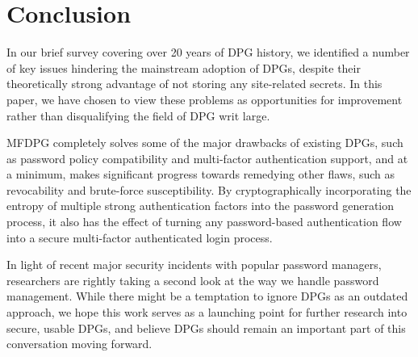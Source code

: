 \section{Conclusion}

In our brief survey covering over 20 years of DPG history, we identified a number of key issues hindering the mainstream adoption of DPGs, despite their theoretically strong advantage of not storing any site-related secrets. 
In this paper, we have chosen to view these problems as opportunities for improvement rather than disqualifying the field of DPG writ large.

MFDPG completely solves some of the major drawbacks of existing DPGs, such as password policy compatibility and multi-factor authentication support, and at a minimum, makes significant progress towards remedying other flaws, such as revocability and brute-force susceptibility. By cryptographically incorporating the entropy of multiple strong authentication factors into the password generation process, it also has the effect of turning any password-based authentication flow into a secure multi-factor authenticated login process.

In light of recent major security incidents with popular password managers, researchers are rightly taking a second look at the way we handle password management. 
While there might be a temptation to ignore DPGs as an outdated approach, we hope this work serves as a launching point for further research into secure, usable DPGs, and believe DPGs should remain an important part of this conversation moving forward.